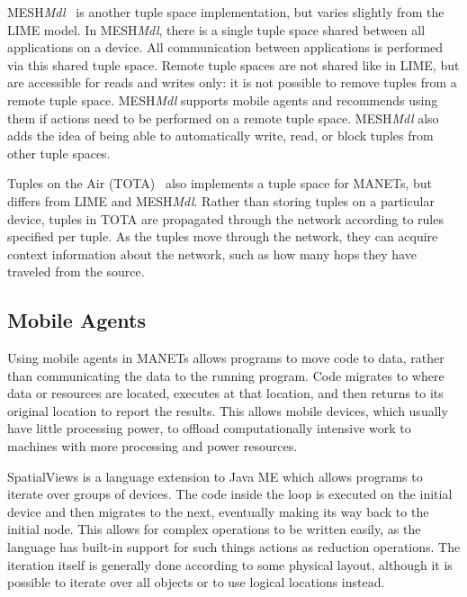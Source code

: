 MESH\textit{Mdl}~\cite{meshmdl}  is another tuple space implementation, but varies slightly from the LIME model. In MESH\textit{Mdl}, there is a single tuple space shared between all applications on a device. All communication between applications is performed via  this shared tuple space. Remote tuple spaces are not shared like in LIME, but are accessible for reads and writes only: it is not possible to remove tuples from a remote tuple space. MESH\textit{Mdl} supports mobile agents and recommends using them if actions need to be performed on a remote tuple space. MESH\textit{Mdl} also adds the idea of being able to automatically write, read, or block tuples from other tuple spaces.

Tuples on the Air (TOTA)~\cite{tota}  also implements a tuple space for MANETs, but differs from LIME and MESH\textit{Mdl}. Rather than storing tuples on a particular device, tuples in TOTA are propagated through the network according to rules specified per tuple. As the tuples move through the network, they can acquire context information about the network, such as how many hops they have traveled from the source.

\subsection{Mobile Agents}

Using mobile agents in MANETs allows programs to move code to data, rather than communicating the data to the running program. Code migrates to where data or resources are located, executes at that location, and then returns to its original location to report the results. This allows mobile devices, which usually have little processing power, to offload computationally intensive work to machines with more processing and power resources.

SpatialViews\cite{sv} is a language extension to Java ME which allows programs to iterate over groups of devices. The code inside the loop is executed on the initial device and then migrates to the next, eventually making its way back to the initial node. This allows for complex operations to be written easily, as the language has built-in support for such things actions as reduction operations. The iteration itself is generally done according to some physical layout, although it is possible to iterate over all objects or to use logical locations instead.
